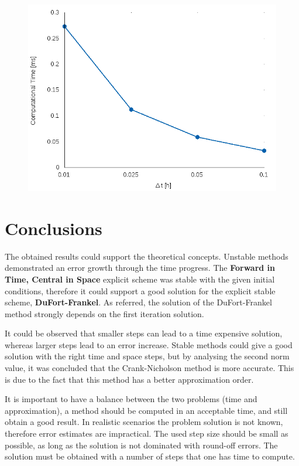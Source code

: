 \documentclass[12pt]{report}
\begin{document}
\begin{figure}[!htb]
  \centering
  \includegraphics[width=.6\linewidth]{laasonen_times.png}
\end{figure}

\pagebreak
\section*{Conclusions}

\par The obtained results could support the theoretical concepts. Unstable methods demonstrated an error growth through the time progress. The \textbf{Forward in Time, Central in Space} explicit scheme was stable with the given initial conditions, therefore it could support a good solution for the explicit stable scheme, \textbf{DuFort-Frankel}. As referred, the solution of the DuFort-Frankel method strongly depends on the first iteration solution.
\par It could be observed that smaller steps can lead to a time expensive solution, whereas larger steps lead to an error increase. Stable methods could give a good solution with the right time and space steps, but by analysing the second norm value, it was concluded that the Crank-Nicholson method is more accurate. This is due to the fact that this method has a better approximation order.
\par It is important to have a balance between the two problems (time and approximation), a method should be computed in an acceptable time, and still obtain a good result. In realistic scenarios the problem solution is not known, therefore error estimates are impractical. The used step size should be small as possible, as long as the solution is not dominated with round-off errors. The solution must be obtained with a number of steps that one has time to compute. 
 
\end{document}
